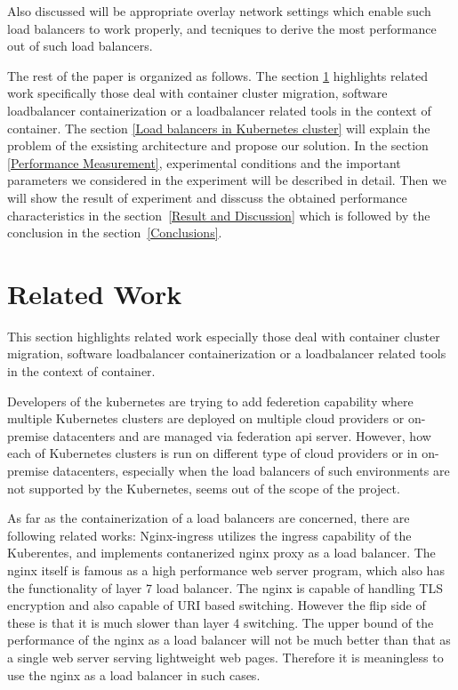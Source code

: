Also discussed will be appropriate overlay network settings which enable such load balancers to work properly, 
and tecniques to derive the most performance out of such load balancers.

The rest of the paper is organized as follows.
The section \ref{Related Work} highlights related work specifically those deal with container cluster migration, 
software loadbalancer containerization or a loadbalancer related tools in the context of container. 
The section \ref{Load balancers in Kubernetes cluster} will explain the problem of the exsisting architecture and propose our solution.
In the section \ref{Performance Measurement}, experimental conditions and the important parameters 
we considered in the experiment will be described in detail.
Then we will show the result of experiment and disscuss the obtained performance characteristics in the section~\ref{Result and Discussion} 
which is followed by the conclusion in the section~\ref{Conclusions}.
  

\section{Related Work}\label{Related Work}
This section highlights related work especially those deal with container cluster migration, 
software loadbalancer containerization or a loadbalancer related tools in the context of container. 

Developers of the kubernetes are trying to add federetion\cite{K8sFederation2017} capability 
where multiple Kubernetes clusters are deployed on multiple cloud providers or on-premise datacenters 
and are managed via federation api server. However, how each of Kubernetes clusters is run on different type of cloud providers
or in on-premise datacenters, especially when the load balancers of such environments are not supported by the Kubernetes, 
seems out of the scope of the project. 
   
As far as the containerization of a load balancers are concerned, there are following related works:
Nginx-ingress\cite{Pleshakov2016,NginxInc2016} utilizes the ingress\cite{K8sIngress2017} capability of the Kuberentes, 
and implements contanerized nginx proxy as a load balancer. The nginx itself is famous as a high performance web server program,
which also has the functionality of layer 7 load balancer. The nginx is capable of handling TLS encryption and also capable of  
URI based switching. However the flip side of these is that it is much slower than layer 4 switching.
The upper bound of the performance of the nginx as a load balancer will not be much better than 
that as a single web server serving lightweight web pages. 
Therefore it is meaningless to use the nginx as a load balancer in such cases.
 
